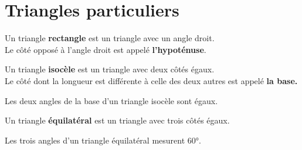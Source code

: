 \section{Triangles particuliers}

{Un triangle \textbf{rectangle} est un triangle avec un angle droit.\\
Le côté opposé à l'angle droit est appelé \textbf{ l'hypoténuse}.}

{Un triangle \textbf{isocèle} est un triangle avec deux côtés égaux.\\
Le côté dont la longueur est différente à celle des deux autres est appelé \textbf{la base.}}

{Les deux angles de la base d'un triangle isocèle sont égaux.}

{Un triangle \textbf{équilatéral} est un triangle avec trois côtés égaux.}

{Les trois angles d'un triangle équilatéral mesurent 60°.}